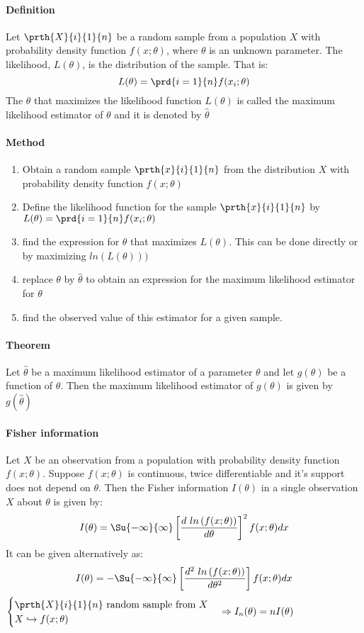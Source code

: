 \paragraph{Definition}
Let $\prth{X}{i}{1}{n}$ be a random sample from a population $X$ with
probability density function $f(x;\theta)$, where $\theta$ is an
unknown parameter. The likelihood, $L(\theta)$, is the distribution of
the sample. That is:
$$
L(\theta) = \prd{{i=1}}{n}f(x_{i};\theta)
$$
The $\theta$ that maximizes the likelihood function $L(\theta)$ is
called the maximum likelihood estimator of $\theta$ and it is denoted
by $\hat{\theta}$

\paragraph{Method}
\begin{enumerate}
	\item Obtain a random sample $\prth{x}{i}{1}{n}$ from the
		distribution $X$ with probability density function
		$f(x;\theta)$
	\item Define the likelihood function for the sample 
		$\prth{x}{i}{1}{n}$ 
		by $L(\theta)=\prd{{i=1}}{n}f(x_{i};\theta)$
	\item find the expression for $\theta$ that maximizes 
		$L(\theta)$. This can be done directly or by maximizing
		$ln\left(L(\theta)\right))$
	\item replace $\theta$ by $\hat{\theta}$ to obtain an 
		expression for the maximum likelihood estimator for
		$\theta$
	\item find the observed value of this estimator for a given
		sample.
\end{enumerate}

\paragraph{Theorem}
Let $\hat{\theta}$ be a maximum likelihood estimator of a parameter
$\theta$ and let $g(\theta)$ be a function of $\theta$. Then the 
maximum likelihood estimator of $g(\theta)$ is given by 
$g\left(\hat{\theta}\right)$

\paragraph{Fisher information}
Let $X$ be an observation from a population with probability density 
function $f(x;\theta)$. Suppose $f(x;\theta)$ is continuous, twice
differentiable and it's support does not depend on $\theta$. Then the
Fisher information $I(\theta)$ in a single observation $X$ about 
$\theta$ is given by:
$$
I(\theta) = \Su{-\infty}{\infty}\left[\frac{d~ln\left(f(x;\theta)\right)}{d\theta}\right]^{2}f(x;\theta)dx
$$
It can be given alternatively as:
$$
I(\theta) = -\Su{-\infty}{\infty}\left[\frac{d^{2}~ln\left(f(x;\theta)\right)}{d\theta^{2}}\right]f(x;\theta)dx
$$
$
\begin{cases}
	\prth{X}{i}{1}{n}\text{ random sample from }X\\
	X\hookrightarrow f(x;\theta)
\end{cases}
\Rightarrow I_{n}(\theta) = nI(\theta)
$

